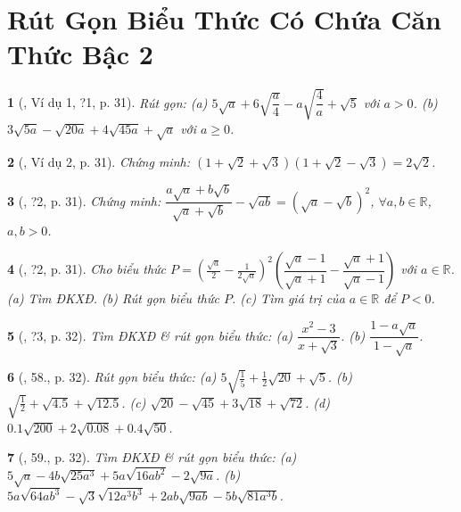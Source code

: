 \documentclass{article}
\newtheorem{baitoan}{}
\begin{document}

\section{Rút Gọn Biểu Thức Có Chứa Căn Thức Bậc 2}

\begin{baitoan}[\cite{SGK_Toan_9_tap_1}, Ví dụ 1, ?1, p. 31]
	Rút gọn: (a) $5\sqrt{a} + 6\sqrt{\dfrac{a}{4}} - a\sqrt{\dfrac{4}{a}} + \sqrt{5}$ với $a > 0$. (b) $3\sqrt{5a} - \sqrt{20a} + 4\sqrt{45a} + \sqrt{a}$ với $a\ge0$.
\end{baitoan}

\begin{baitoan}[\cite{SGK_Toan_9_tap_1}, Ví dụ 2, p. 31]
	Chứng minh: $(1 + \sqrt{2} + \sqrt{3})(1 + \sqrt{2} - \sqrt{3}) = 2\sqrt{2}$.
\end{baitoan}

\begin{baitoan}[\cite{SGK_Toan_9_tap_1}, ?2, p. 31]
	Chứng minh: $\dfrac{a\sqrt{a} + b\sqrt{b}}{\sqrt{a} + \sqrt{b}} - \sqrt{ab} = (\sqrt{a} - \sqrt{b})^2$, $\forall a,b\in\mathbb{R}$, $a,b > 0$.
\end{baitoan}

\begin{baitoan}[\cite{SGK_Toan_9_tap_1}, ?2, p. 31]
	Cho biểu thức $P = \left(\frac{\sqrt{a}}{2} - \frac{1}{2\sqrt{a}}\right)^2\left(\dfrac{\sqrt{a} - 1}{\sqrt{a} + 1} - \dfrac{\sqrt{a} + 1}{\sqrt{a} - 1}\right)$ với $a\in\mathbb{R}$. (a) Tìm ĐKXĐ. (b) Rút gọn biểu thức $P$. (c) Tìm giá trị của $a\in\mathbb{R}$ để $P < 0$.
\end{baitoan}

\begin{baitoan}[\cite{SGK_Toan_9_tap_1}, ?3, p. 32]
	Tìm ĐKXĐ \& rút gọn biểu thức: (a) $\dfrac{x^2 - 3}{x + \sqrt{3}}$. (b) $\dfrac{1 - a\sqrt{a}}{1 - \sqrt{a}}$.
\end{baitoan}

\begin{baitoan}[\cite{SGK_Toan_9_tap_1}, 58., p. 32]
	Rút gọn biểu thức: (a) $5\sqrt{\frac{1}{5}} + \frac{1}{2}\sqrt{20} + \sqrt{5}$. (b) $\sqrt{\frac{1}{2}} + \sqrt{4.5} + \sqrt{12.5}$. (c) $\sqrt{20} - \sqrt{45} + 3\sqrt{18} + \sqrt{72}$. (d) $0.1\sqrt{200} + 2\sqrt{0.08} + 0.4\sqrt{50}$.
\end{baitoan}

\begin{baitoan}[\cite{SGK_Toan_9_tap_1}, 59., p. 32]
	Tìm ĐKXĐ \& rút gọn biểu thức: (a) $5\sqrt{a} - 4b\sqrt{25a^3} + 5a\sqrt{16ab^2} - 2\sqrt{9a}$. (b) $5a\sqrt{64ab^3} - \sqrt{3}\sqrt{12a^3b^3} + 2ab\sqrt{9ab} - 5b\sqrt{81a^3b}$.
\end{baitoan}
\end{document}
